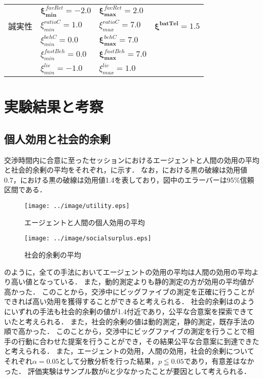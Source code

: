 \begin{table}[!tb]
\begin{tabular}{llll}
        & $\bm{\xi_{min}^{\mathit{favRet}} = -2.0}$ & $\bm{\xi_{max}^{\mathit{favRet}} = 2.0}$ \\
        誠実性 & $\xi_{min}^{\mathit{ratioC}} = 1.0$ & $\xi_{max}^{\mathit{ratioC}} = 7.0$ & $\bm{\xi^{batTel} = 1.5}$ \\
        & $\xi_{min}^{\mathit{behC}} = 0.0$ & $\bm{\xi_{max}^{\mathit{behC}} = 7.0}$ \\
        & $\xi_{min}^{\mathit{fastBeh}} = 0.0$ & $\bm{\xi_{max}^{\mathit{fastBeh}} = 7.0}$ \\
        & $\xi_{min}^{\mathit{lie}} = -1.0$ & $\xi_{max}^{\mathit{lie}} = 1.0$ \\ \bottomrule
    \end{tabular}
    \label{tab:xi-param}
\end{table}

\section{実験結果と考察}
\subsection{個人効用と社会的余剰}
交渉時間内に合意に至ったセッションにおけるエージェントと人間の効用の平均と社会的余剰の平均をそれぞれ，に示す．
なお，における黒の破線は効用値0.7，における黒の破線は効用値1.4を表しており，図中のエラーバーは95\%信頼区間である．

\begin{figure}[bt]
    \begin{minipage}[b]{0.47\linewidth}
        \centering
        \texttt{[image: ../image/utility.eps]}
        \caption{エージェントと人間の個人効用の平均}\label{fig:util}
    \end{minipage}
    \begin{minipage}[b]{0.47\linewidth}
        \centering
        \texttt{[image: ../image/socialsurplus.eps]}
        \caption{社会的余剰の平均}\label{fig:socialsurplus}
    \end{minipage}
\end{figure}

のように，全ての手法においてエージェントの効用の平均は人間の効用の平均より高い値となっている．
また，動的測定よりも静的測定の方が効用の平均値が高かった．
このことから，交渉中にビッグファイブの測定を正確に行うことができれば高い効用を獲得することができると考えられる．
社会的余剰はのようにいずれの手法も社会的余剰の値が1.4付近であり，公平な合意案を探索できていたと考えられる．
また，社会的余剰の値は動的測定，静的測定，既存手法の順で高かった．
このことから，交渉中にビッグファイブの測定を行うことで相手の行動に合わせた提案を行うことができ，その結果公平な合意案に到達できたと考えられる．
また，エージェントの効用，人間の効用，社会的余剰についてそれぞれ$\alpha = 0.05$として分散分析を行った結果，$p \leqq 0.05$であり，有意差はなかった．
評価実験はサンプル数が6と少なかったことが要因として考えられる．

